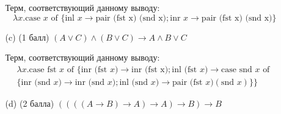 \begin{enumerate}
\begin{itemize}
\begin{solution}
\begin{prooftree}
      \end{prooftree}
      Терм, соответствующий данному выводу:
      \begin{equation}
        \lambda x. \text{case } x \text{ of } \{\text{inl } x \rightarrow \text{pair (fst x) (snd x)}; \text{inr } x \rightarrow \text{pair (fst x) (snd x)}\}
      \end{equation}
    \end{solution}
    \item[(c)] (1 балл) $(A \lor C) \land (B \lor C) \rightarrow A \land B \lor C$
    \begin{solution}
      \hspace{0.01cm}
      \begin{prooftree}
      \end{prooftree}
      Терм, соответствующий данному выводу:
      \begin{eqnarray}
        \lambda x. \text{case fst } x \text{ of } \{\text{inr (fst } x) \rightarrow \text{inr (fst x)}; \text{inl (fst } x) \rightarrow \text{case snd } x \text{ of } \\\{\text{inr (snd } x) \rightarrow \text{inr (snd } x);\text{inl (snd } x) \rightarrow \text{pair (fst } x) (\text{snd }x)\}\}
      \end{eqnarray}
    \end{solution}
    \item[(d)] (2 балла) $((((A \rightarrow B) \rightarrow A) \rightarrow A) \rightarrow B) \rightarrow B$
    \begin{solution}
      \hspace{0.01cm}
      \begin{prooftree}

\end{prooftree}
\end{solution}
\end{itemize}
\end{enumerate}
